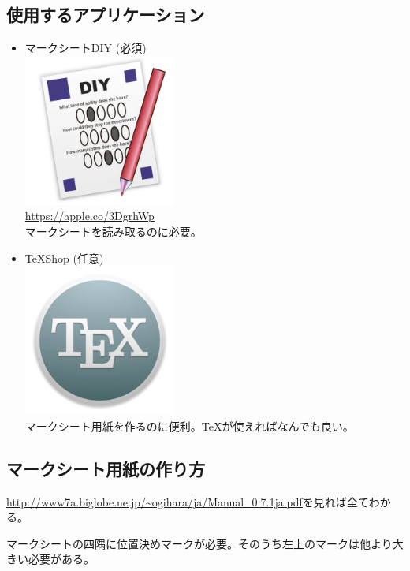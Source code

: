 \documentclass[dvipdfmx,jb5]{jarticle}
\begin{document}
\subsection{使用するアプリケーション}
\begin{itemize}
 \item マークシートDIY {\color{red}(必須)}\\
 \includegraphics[width=5cm]{assets/answersheet-diy.png}\\
 \url{https://apple.co/3DgrhWp}\\
 マークシートを読み取るのに必要。
 \item \TeX Shop (任意)\\
 \includegraphics[width=5cm]{assets/TeX.png}\\
 マークシート用紙を作るのに便利。\TeX が使えればなんでも良い。
\end{itemize}
 \subsection{マークシート用紙の作り方}
 \url{http://www7a.biglobe.ne.jp/~ogihara/ja/Manual_0.7.1ja.pdf}を見れば全てわかる。

 マークシートの四隅に位置決めマークが必要。そのうち左上のマークは他より大きい必要がある。
\end{document}
